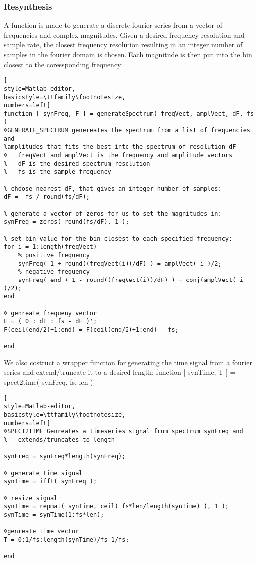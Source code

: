 \subsubsection{ Resynthesis }
A function is made to generate a discrete fourier series from a vector of
frequencies and complex magnitudes. Given a desired frequency resolution and
sample rate, the closest frequency resolution resulting in an integer number of
samples in the fourier domain is chosen. Each magnitude is then put into the bin
closest to the coressponding frequency:
\begin{lstlisting}[
style=Matlab-editor,
basicstyle=\ttfamily\footnotesize,
numbers=left]
function [ synFreq, F ] = generateSpectrum( freqVect, amplVect, dF, fs )
%GENERATE_SPECTRUM genereates the spectrum from a list of frequencies and
%amplitudes that fits the best into the spectrum of resolution dF
%   freqVect and amplVect is the frequency and amplitude vectors
%   dF is the desired spectrum resolution
%   fs is the sample frequency

% choose nearest dF, that gives an integer number of samples:
dF =  fs / round(fs/dF);

% generate a vector of zeros for us to set the magnitudes in:
synFreq = zeros( round(fs/dF), 1 );

% set bin value for the bin closest to each specified frequency:
for i = 1:length(freqVect)
    % positive frequency
    synFreq( 1 + round((freqVect(i))/dF) ) = amplVect( i )/2;
    % negative frequency
    synFreq( end + 1 - round((freqVect(i))/dF) ) = conj(amplVect( i )/2);
end

% genreate frequeny vector
F = ( 0 : dF : fs - dF )';
F(ceil(end/2)+1:end) = F(ceil(end/2)+1:end) - fs;

end
\end{lstlisting}

We also costruct a wrapper function for generating the time signal from a
fourier series and extend/truncate it to a desired length:
function [ synTime, T ] = spect2time( synFreq, fs, len )
\begin{lstlisting}[
style=Matlab-editor,
basicstyle=\ttfamily\footnotesize,
numbers=left]
%SPECT2TIME Genreates a timeseries signal from spectrum synFreq and
%   extends/truncates to length

synFreq = synFreq*length(synFreq);

% generate time signal
synTime = ifft( synFreq );

% resize signal
synTime = repmat( synTime, ceil( fs*len/length(synTime) ), 1 );
synTime = synTime(1:fs*len);

%genreate time vector
T = 0:1/fs:length(synTime)/fs-1/fs;

end
\end{lstlisting}


